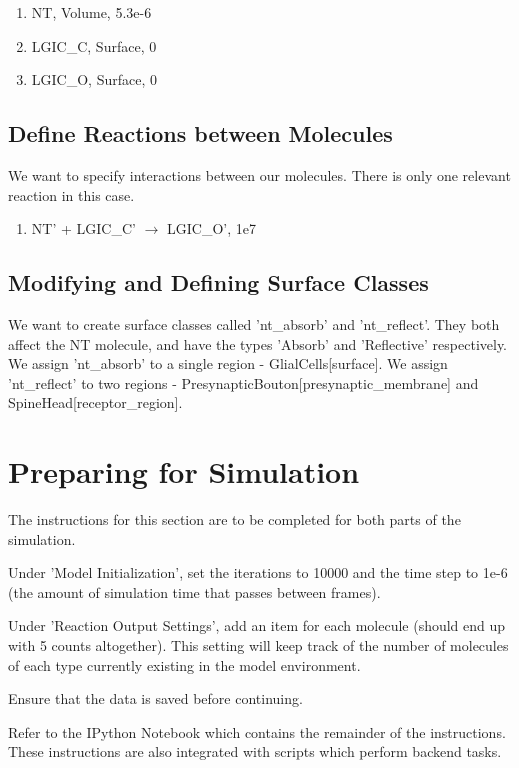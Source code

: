 \documentclass[twoside,a4paper]{refart}
\begin{document}
\begin{enumerate}
    \item NT, Volume, 5.3e-6
    \item LGIC\_C, Surface, 0
    \item LGIC\_O, Surface, 0
\end{enumerate} 

\subsection{Define Reactions between Molecules}
We want to specify interactions between our molecules. There is only one relevant reaction in this case.

\begin{enumerate}
    \item NT' + LGIC\_C' $\to$ LGIC\_O', 1e7
\end{enumerate}

\subsection{Modifying and Defining Surface Classes}
We want to create surface classes called 'nt\_absorb' and 'nt\_reflect'. They both affect the NT molecule, and have the types 'Absorb' and 'Reflective' respectively. We assign 'nt\_absorb' to a single region - GlialCells[surface]. We assign 'nt\_reflect' to two regions - PresynapticBouton[presynaptic\_membrane] and SpineHead[receptor\_region].

\section{Preparing for Simulation}
The instructions for this section are to be completed for both parts of the simulation.

Under 'Model Initialization', set the iterations to 10000 and the time step to 1e-6 (the amount of simulation time that passes between frames).

Under 'Reaction Output Settings', add an item for each molecule (should end up with 5 counts altogether). This setting will keep track of the number of molecules of each type currently existing in the model environment.

Ensure that the data is saved before continuing.

Refer to the IPython Notebook which contains the remainder of the instructions. These instructions are also integrated with scripts which perform backend tasks.
\end{document}
